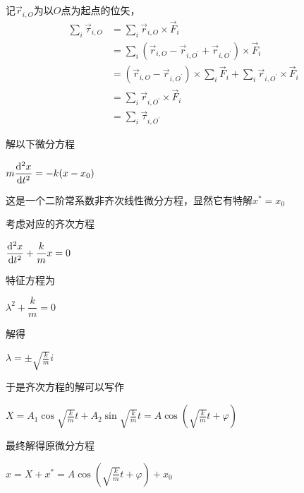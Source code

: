 \chapter[振动与波]{}
\begin{prove}
    记$\vec{r}_{i,O}$为以$O$点为起点的位矢，
    $$
        \begin{aligned}
            \sum\limits_{i}\vec{\tau}_{i,O} & =\sum\limits_{i}\vec{r}_{i,O}\times\vec{F}_{i}                                                                                            \\
                                            & =\sum\limits_{i}\left(\vec{r}_{i,O}-\vec{r}_{i,O^{\prime}}+\vec{r}_{i,O^{\prime}}\right)\times\vec{F}_{i}                                 \\
                                            & =\left(\vec{r}_{i,O}-\vec{r}_{i,O^{\prime}}\right)\times\sum\limits_{i}\vec{F}_{i}+\sum\limits_{i}\vec{r}_{i,O^{\prime}}\times\vec{F}_{i} \\
                                            & =\sum\limits_{i}\vec{r}_{i,O^{\prime}}\times\vec{F}_{i}                                                                                   \\
                                            & =\sum\limits_{i}\vec{\tau}_{i,O^{\prime}}
        \end{aligned}
    $$
\end{prove}

\begin{prove}[求解简谐振动的微分方程]
    解以下微分方程
    \begin{center}
        $m\D[2]{x}{t}=-k(x-x_0)$
    \end{center}
    这是一个二阶常系数非齐次线性微分方程，显然它有特解$x^*=x_0$\par
    考虑对应的齐次方程\par
    \begin{center}
        $\D[2]{x}{t}+\dfrac{k}{m}x=0$
    \end{center}
    特征方程为\par
    \begin{center}
        $\lambda^2+\dfrac{k}{m}=0$
    \end{center}
    解得\par
    \begin{center}
        $\lambda=\pm \sqrt{\frac{k}{m}}i$
    \end{center}
    于是齐次方程的解可以写作\par
    \begin{center}
        $X=A_1\cos \sqrt{\frac{k}{m}}t+A_2\sin \sqrt{\frac{k}{m}}t=A\cos(\sqrt{\frac{k}{m}} t+\varphi)$
    \end{center}
    最终解得原微分方程
    \begin{center}
        $x=X+x^*=A\cos(\sqrt{\frac{k}{m}} t+\varphi)+x_0$
    \end{center}
\end{prove}

